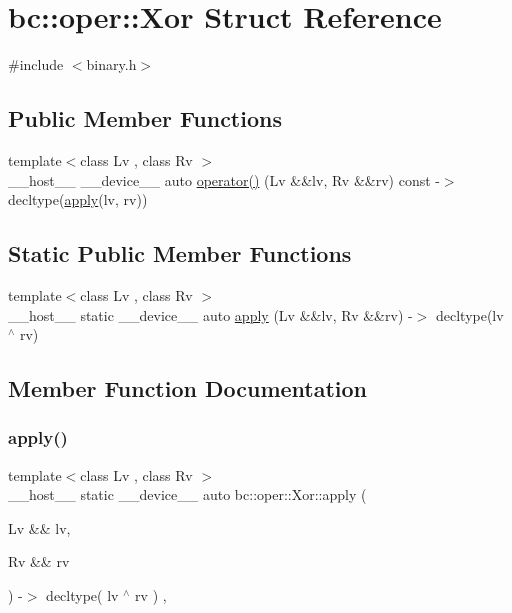 \hypertarget{structbc_1_1oper_1_1Xor}{}\section{bc\+:\+:oper\+:\+:Xor Struct Reference}
\label{structbc_1_1oper_1_1Xor}


{\ttfamily \#include $<$binary.\+h$>$}

\subsection*{Public Member Functions}
\begin{DoxyCompactItemize}
\item 
{\footnotesize template$<$class Lv , class Rv $>$ }\\\+\_\+\+\_\+host\+\_\+\+\_\+ \+\_\+\+\_\+device\+\_\+\+\_\+ auto \hyperlink{structbc_1_1oper_1_1Xor_a8e539de4f2934a9a45313a191d41b422}{operator()} (Lv \&\&lv, Rv \&\&rv) const -\/$>$ decltype(\hyperlink{structbc_1_1oper_1_1Xor_a6af44f0d3ca3436078ca25332bba0bb2}{apply}(lv, rv))
\end{DoxyCompactItemize}
\subsection*{Static Public Member Functions}
\begin{DoxyCompactItemize}
\item 
{\footnotesize template$<$class Lv , class Rv $>$ }\\\+\_\+\+\_\+host\+\_\+\+\_\+ static \+\_\+\+\_\+device\+\_\+\+\_\+ auto \hyperlink{structbc_1_1oper_1_1Xor_a6af44f0d3ca3436078ca25332bba0bb2}{apply} (Lv \&\&lv, Rv \&\&rv) -\/$>$ decltype(lv $^\wedge$ rv)
\end{DoxyCompactItemize}


\subsection{Member Function Documentation}
\mbox{\label{structbc_1_1oper_1_1Xor_a6af44f0d3ca3436078ca25332bba0bb2}} 
\subsubsection{\texorpdfstring{apply()}{apply()}}
{\footnotesize\ttfamily template$<$class Lv , class Rv $>$ \\
\+\_\+\+\_\+host\+\_\+\+\_\+ static \+\_\+\+\_\+device\+\_\+\+\_\+ auto bc\+::oper\+::\+Xor\+::apply (\begin{DoxyParamCaption}\item[{Lv \&\&}]{lv,  }\item[{Rv \&\&}]{rv }\end{DoxyParamCaption}) -\/$>$ decltype( lv $^\wedge$ rv ) \hspace{0.3cm}{\ttfamily [inline]}, {\ttfamily [static]}}

